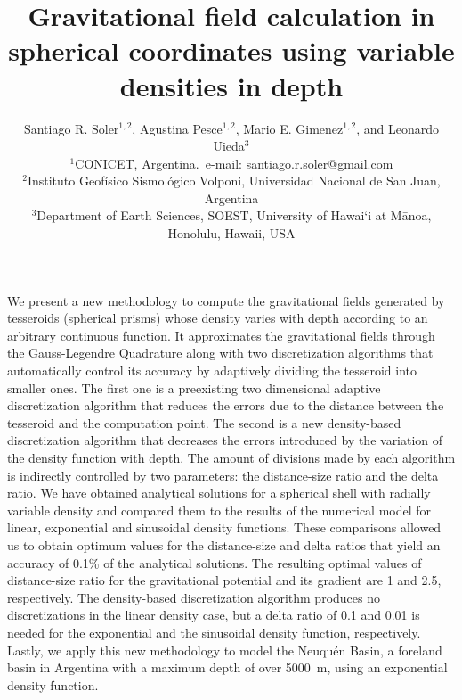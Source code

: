 \documentclass[extra, referee]{gji}
\begin{document}
\title[Variable Density Tesseroids]{
    Gravitational field calculation in spherical coordinates using variable
    densities in depth
}
\author[S.R. Soler, A. Pesce, M.E. Gimenez, and L. Uieda]{
    Santiago R. Soler$^{1,2}$, Agustina Pesce$^{1,2}$,
    Mario E. Gimenez$^{1,2}$, and Leonardo Uieda$^3$ \\
    $^1$CONICET, Argentina.~e-mail: santiago.r.soler@gmail.com\\
    $^2$Instituto Geofísico Sismológico Volponi, Universidad Nacional de
    San Juan, Argentina\\
    $^3$Department of Earth Sciences, SOEST, University of Hawai‘i at
    M\={a}noa, Honolulu, Hawaii, USA
}


\maketitle

\begin{summary}
We present a new methodology to compute the gravitational fields generated by
tesseroids (spherical prisms) whose density varies with depth according to
an arbitrary continuous function.
It approximates the gravitational fields through the Gauss-Legendre Quadrature along
with two discretization algorithms that automatically control its accuracy by adaptively
dividing the tesseroid into smaller ones.
The first one is a preexisting two dimensional adaptive discretization algorithm that
reduces the errors due to the distance between the tesseroid and the computation point.
The second is a new density-based discretization algorithm that
decreases the errors introduced by the variation of the density function with depth.
The amount of divisions made by each algorithm is indirectly controlled
by two parameters: the distance-size ratio and the delta ratio.
We have obtained analytical solutions for a spherical shell with radially variable
density and compared them to the results of the numerical model for linear,
exponential and sinusoidal density functions.
These comparisons allowed us to obtain optimum values for the distance-size and
delta ratios that yield an accuracy of 0.1\% of the analytical solutions.
The resulting optimal values of distance-size ratio for the gravitational potential and
its gradient are 1 and 2.5, respectively.
The density-based discretization algorithm produces no discretizations in the linear
density case, but a delta ratio of 0.1 and 0.01 is needed for the exponential and the
sinusoidal density function, respectively.
Lastly, we apply this new methodology to model the Neuqu\'en Basin, a foreland basin in
Argentina with a maximum depth of over 5000~m, using an exponential density function.
\end{summary}
\end{document}
